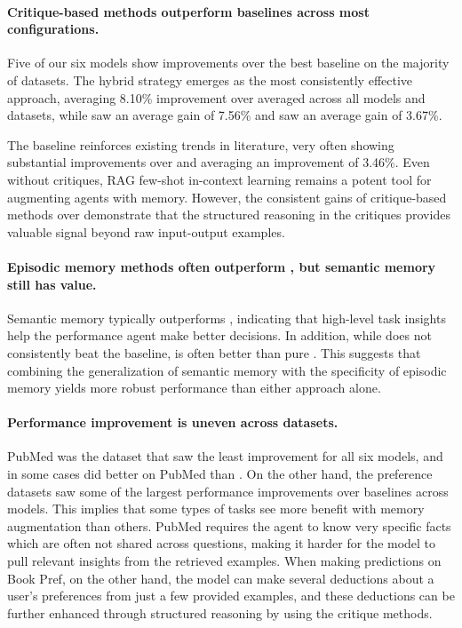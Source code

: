 \paragraph{Critique-based methods outperform baselines across most configurations.}
Five of our six models show improvements over the best baseline on the majority of datasets. The hybrid \EPSEMCRIT{} strategy emerges as the most consistently effective approach, averaging 8.10\% improvement over \ZEROSHOT{} averaged across all models and datasets, while \EPCRIT{} saw an average gain of 7.56\% and \SEMCRIT{} saw an average gain of 3.67\%.

The \EPLABEL{} baseline reinforces existing trends in literature, very often showing substantial improvements over \ZEROSHOT{} and averaging an improvement of 3.46\%. Even without critiques, RAG few-shot in-context learning remains a potent tool for augmenting agents with memory. However, the consistent gains of critique-based methods over \EPLABEL{} demonstrate that the structured reasoning in the critiques provides valuable signal beyond raw input-output examples.

\paragraph{Episodic memory methods often outperform \SEMCRIT{}, but semantic memory still has value.} Semantic memory typically outperforms \ZEROSHOT{}, indicating that high-level task insights help the performance agent make better decisions. In addition, while \SEMCRIT{} does not consistently beat the \EPLABEL{} baseline, \EPSEMCRIT{} is often better than pure \EPCRIT{}. 
This suggests that combining the generalization of semantic memory with the specificity of episodic memory yields more robust performance than either approach alone.

\paragraph{Performance improvement is uneven across datasets.} PubMed was the dataset that saw the least improvement for all six models, and in some cases \ZEROSHOT{} did better on PubMed than \EPLABEL{}. On the other hand, the preference datasets saw some of the largest performance improvements over baselines across models. This implies that some types of tasks see more benefit with memory augmentation than others. PubMed requires the agent to know very specific facts which are often not shared across questions, making it harder for the model to pull relevant insights from the retrieved examples. When making predictions on Book Pref, on the other hand, the model can make several deductions about a user's preferences from just a few provided examples, and these deductions can be further enhanced through structured reasoning by using the critique methods.

